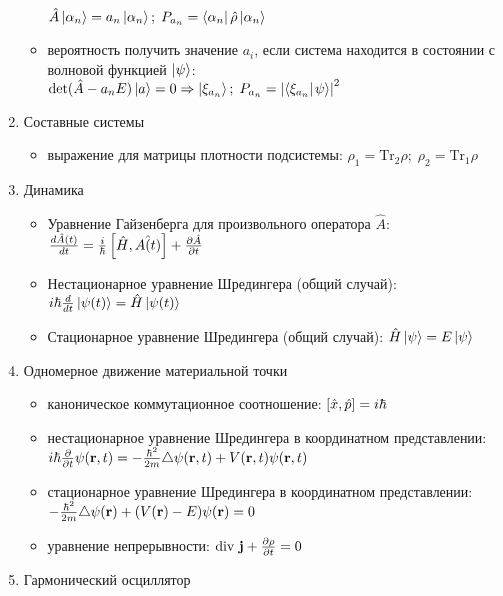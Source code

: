 \begin{enumerate}[label=\textbf{\underline{\arabic*.}}]
\begin{itemize}
            $ \hat{A}\ket{\alpha_n}=a_n\ket{\alpha_n};\; P_{a_n} = \matrixel{\alpha_n}{\hat{\rho}}{\alpha_n} $
            \item вероятность получить значение $a_i$, если система находится в состоянии с волновой функцией $\left| \psi \right>$: \\
            $ \text{det}(\hat{A}-a_n E)\ket{a} = 0 \Rightarrow \ket{\xi_{a_n}};\; P_{a_n} = \abs{\braket{\xi_{a_n}}{\psi}}^2 $
        \end{itemize}
\item Составные системы  \begin{itemize}
            \item выражение для матрицы плотности подсистемы:
            $ \rho_1 = \text{Tr}_2 \rho;\; \rho_2 = \text{Tr}_1 \rho $
        \end{itemize}
\item Динамика  \begin{itemize}
            \item Уравнение Гайзенберга для произвольного оператора $\hat{A}$:
            $ \frac{d \hat{A}(t)}{d t}=\frac{i}{\hbar}\left[ \hat{H}, \hat{A(t)} \right]+\frac{\partial \hat{A}}{\partial t} $
            \item Нестационарное уравнение Шредингера (общий случай):
            $ i\hbar \frac{d }{d t}\left| \psi(t) \right> = \hat{H}\left| \psi(t) \right> $
            \item Стационарное уравнение Шредингера (общий случай):
            $ \hat{H}\left| \psi \right> = E\left| \psi \right> $
        \end{itemize}
\item Одномерное движение материальной точки  \begin{itemize}
            \item каноническое коммутационное соотношение:
            $ \left[ \hat{x}, \hat{p} \right] = i\hbar $
            \item нестационарное уравнение Шредингера в координатном представлении: \\
            $ i\hbar \frac{\partial }{\partial t}\psi(\mathbf{r},t) = -\frac{\hbar^2}{2m}\triangle\psi(\mathbf{r},t)+V(\mathbf{r},t)\psi(\mathbf{r},t) $
            \item стационарное уравнение Шредингера в координатном представлении: \\
            $ -\frac{\hbar^2}{2m}\triangle\psi(\mathbf{r}) + (V(\mathbf{r})-E)\psi(\mathbf{r}) = 0 $
            \item уравнение непрерывности:
            $ \text{div}\ \v{j} + \pd{\rho}{t} = 0 $
        \end{itemize}
\item Гармонический осциллятор  \begin{itemize}

\end{itemize}
\end{enumerate}
